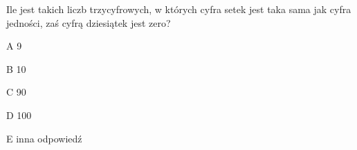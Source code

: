 \begin{tresc}
Ile jest takich liczb trzycyfrowych, w których cyfra setek jest taka sama jak cyfra jedności, zaś cyfrą dziesiątek jest zero?
\end{tresc}
\begin{wariant}{A} 9 \end{wariant}
\begin{wariant}{B} 10 \end{wariant}
\begin{wariant}{C} 90 \end{wariant}
\begin{wariant}{D} 100 \end{wariant}
\begin{wariant}{E} inna odpowiedź \end{wariant}
